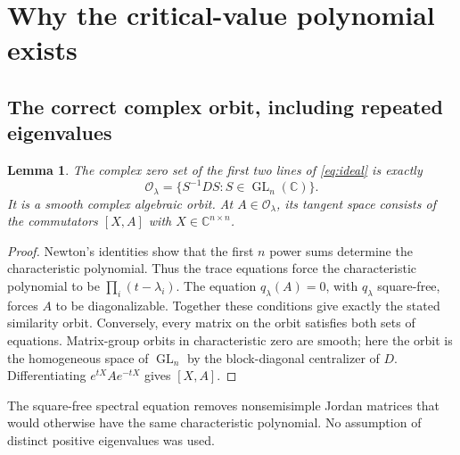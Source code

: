 \documentclass[11pt]{article}
\newcommand{\C}{\mathbb C}
\DeclareMathOperator{\GL}{GL}
\newtheorem{lemma}[theorem]{Lemma}
\theoremstyle{definition}\newtheorem{definition}[theorem]{Definition}
\theoremstyle{remark}\newtheorem{remark}[theorem]{Remark}
\begin{document}
\section{Why the critical-value polynomial exists}\label{sec:critical}
\subsection{The correct complex orbit, including repeated eigenvalues}
\begin{lemma}\label{lem:orbit}
The complex zero set of the first two lines of \eqref{eq:ideal} is exactly
\[
 \mathcal O_\lambda=\{S^{-1}DS:S\in\GL_n(\C)\}.
\]
It is a smooth complex algebraic orbit. At $A\in\mathcal O_\lambda$, its tangent space consists of the commutators $[X,A]$ with $X\in\C^{n\times n}$.
\end{lemma}
\begin{proof}
Newton's identities show that the first $n$ power sums determine the characteristic polynomial. Thus the trace equations force the characteristic polynomial to be $\prod_i(t-\lambda_i)$. The equation $q_\lambda(A)=0$, with $q_\lambda$ square-free, forces $A$ to be diagonalizable. Together these conditions give exactly the stated similarity orbit. Conversely, every matrix on the orbit satisfies both sets of equations. Matrix-group orbits in characteristic zero are smooth; here the orbit is the homogeneous space of $\GL_n$ by the block-diagonal centralizer of $D$. Differentiating $e^{tX}Ae^{-tX}$ gives $[X,A]$.
\end{proof}
The square-free spectral equation removes nonsemisimple Jordan matrices that would otherwise have the same characteristic polynomial. No assumption of distinct positive eigenvalues was used.
\end{document}
